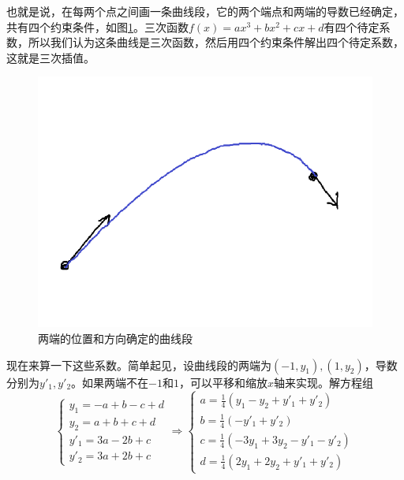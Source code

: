 也就是说，在每两个点之间画一条曲线段，它的两个端点和两端的导数已经确定，共有四个约束条件，如图\ref{fig-cubic-interpo}。三次函数$f(x)=a x^3+b x^2+c x+d$有四个待定系数，所以我们认为这条曲线是三次函数，然后用四个约束条件解出四个待定系数，这就是三次插值。
\begin{figure}[htb]
\centering
\includegraphics[scale=0.5]{fig/cubic-interpo.png}
\caption{两端的位置和方向确定的曲线段}
\label{fig-cubic-interpo}
\end{figure}

现在来算一下这些系数。简单起见，设曲线段的两端为$(-1,y_1),(1,y_2)$，导数分别为$y'_1,y'_2$。如果两端不在$-1$和$1$，可以平移和缩放$x$轴来实现。解方程组
\begin{equation*}
\begin{cases}
y_1=-a+b-c+d \\
y_2=a+b+c+d \\
y'_1=3 a-2 b+c \\
y'_2=3 a+2 b+c
\end{cases} \Rightarrow \begin{cases}
a=\frac{1}{4}(y_1-y_2+y'_1+y'_2) \\
b=\frac{1}{4}(-y'_1+y'_2) \\
c=\frac{1}{4}(-3 y_1+3 y_2-y'_1-y'_2) \\
d=\frac{1}{4}(2y_1+2y_2+y'_1+y'_2)
\end{cases}
\end{equation*}


